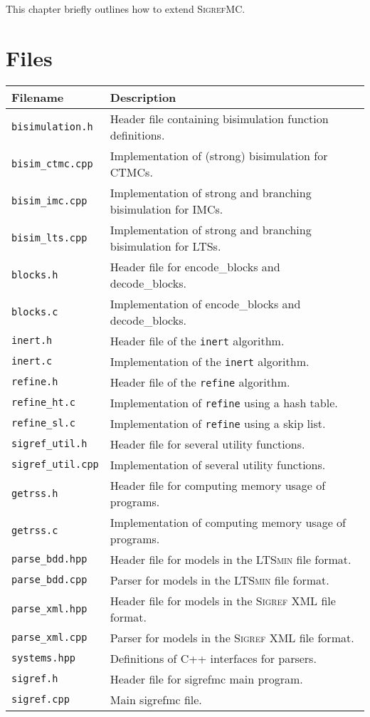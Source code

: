 
This chapter briefly outlines how to extend \textsc{SigrefMC}.

\section{Files}

\renewcommand{\arraystretch}{1.3}
\begin{tabu}{XX[p3]}
\toprule
Filename & Description \\
\midrule
\texttt{bisimulation.h} & Header file containing bisimulation function definitions. \\
\texttt{bisim\_ctmc.cpp} & Implementation of (strong) bisimulation for CTMCs. \\
\texttt{bisim\_imc.cpp} & Implementation of strong and branching bisimulation for IMCs. \\
\texttt{bisim\_lts.cpp} & Implementation of strong and branching bisimulation for LTSs. \\
\texttt{blocks.h} & Header file for encode\_blocks and decode\_blocks.\\
\texttt{blocks.c} & Implementation of encode\_blocks and decode\_blocks. \\
\texttt{inert.h} & Header file of the \texttt{inert} algorithm. \\
\texttt{inert.c} & Implementation of the \texttt{inert} algorithm. \\
\texttt{refine.h} & Header file of the \texttt{refine} algorithm. \\
\texttt{refine\_ht.c} & Implementation of \texttt{refine} using a hash table. \\
\texttt{refine\_sl.c} & Implementation of \texttt{refine} using a skip list. \\
\texttt{sigref\_util.h} & Header file for several utility functions. \\
\texttt{sigref\_util.cpp} & Implementation of several utility functions. \\
\texttt{getrss.h} & Header file for computing memory usage of programs. \\
\texttt{getrss.c} & Implementation of computing memory usage of programs. \\
\texttt{parse\_bdd.hpp} & Header file for models in the \textsc{LTSmin} file format. \\
\texttt{parse\_bdd.cpp} & Parser for models in the \textsc{LTSmin} file format. \\
\texttt{parse\_xml.hpp} & Header file for models in the \textsc{Sigref} XML file format. \\
\texttt{parse\_xml.cpp} & Parser for models in the \textsc{Sigref} XML file format. \\
\texttt{systems.hpp} & Definitions of C++ interfaces for parsers. \\
\texttt{sigref.h} & Header file for sigrefmc main program. \\
\texttt{sigref.cpp} & Main sigrefmc file. \\
\bottomrule
\end{tabu}

